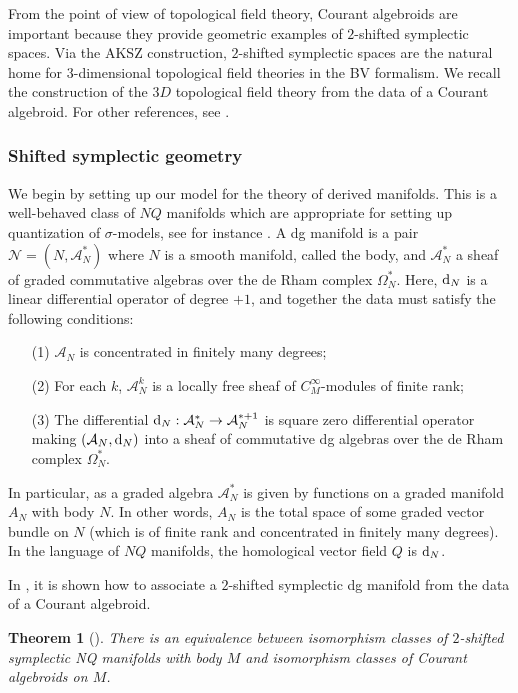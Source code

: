 \documentclass{article}
\newcommand{\cN}{\mathcal{N}}
\def\sA{\mathcal{A}}
\def\d{{\rm d}}
\newtheorem{theorem}{Theorem}[section]
\theoremstyle{definition}
\theoremstyle{remark}
\begin{document}
From the point of view of topological field theory, Courant algebroids are important because they provide geometric examples of $2$-shifted symplectic spaces. 
Via the AKSZ construction, $2$-shifted symplectic spaces are the natural home for $3$-dimensional topological field theories in the BV formalism. 
We recall the construction of the $3D$ topological field theory from the data of a Courant algebroid. 
For other references, see \cite{Roytenberg:2002nu, Cattaneo:2009zx}. 

\subsubsection{Shifted symplectic geometry} 
\label{sec: dgman}

We begin by setting up our model for the theory of derived manifolds. 
This is a well-behaved class of $NQ$ manifolds which are appropriate for setting up quantization of $\sigma$-models, see for instance \cite{CostelloSUSY}. 
A dg manifold is a pair $\cN = (N, \sA^*_N)$ where $N$ is a smooth manifold, called the body, and $\sA^*_N$ a sheaf of graded commutative algebras over the de Rham complex $\Omega^*_N$.
Here, $\d_N$ is a linear differential operator of degree $+1$, and together the data must satisfy the following conditions:
\begin{itemize}
\item[(1)] $\sA_N$ is concentrated in finitely many degrees;
\item[(2)] For each $k$, $\sA^k_N$ is a locally free sheaf of $C^\infty_M$-modules of finite rank;
\item[(3)] The differential $\d_N : \sA_N^* \to \sA_N^{*+1}$ is square zero differential operator making $(\sA_N , \d_N)$ into a sheaf of commutative dg algebras over the de Rham complex $\Omega^*_N$.
\end{itemize}

In particular, as a graded algebra $\sA^*_N$ is given by functions on a graded manifold $A_N$ with body $N$.
In other words, $A_N$ is the total space of some graded vector bundle on $N$ (which is of finite rank and concentrated in finitely many degrees). 
In the language of $NQ$ manifolds, the homological vector field $Q$ is $\d_N$. 

In \cite{Roytenberg:2002nu}, it is shown how to associate a $2$-shifted symplectic dg manifold from the data of a Courant algebroid. 

\begin{theorem}[\cite{Roytenberg:2002nu}]
There is an equivalence between isomorphism classes of $2$-shifted symplectic NQ manifolds with body $M$ and isomorphism classes of Courant algebroids on $M$.
\end{theorem}
\end{document}
